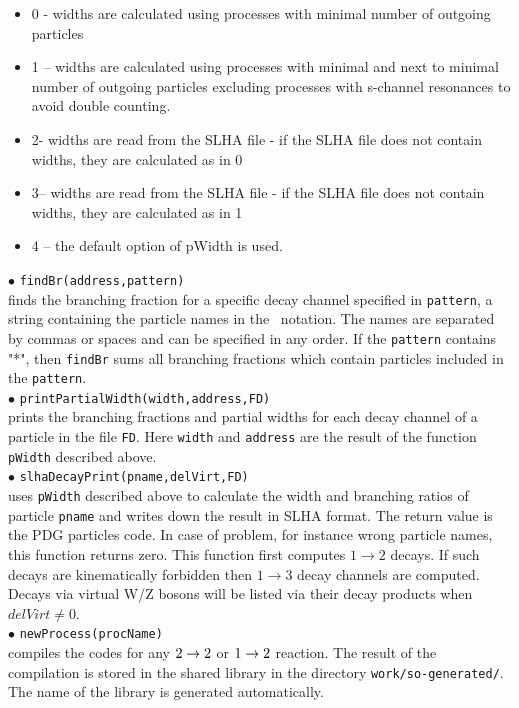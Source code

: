 \documentclass[12pt,a4paper]{article}
\begin{document}
\begin{itemize}
\item{}0 -  widths are calculated using processes with minimal number of outgoing particles
\item{}1 -- widths are calculated using processes with minimal and next to minimal number of outgoing particles excluding
                       processes with  s-channel resonances to avoid double counting.
                  \item{} 2- widths are read from the SLHA file - if the SLHA file does not contain widths, they are calculated as in 0
                    \item{} 3-- widths are read from the SLHA file - if the SLHA file does not contain widths, they are calculated as in 1
                       \item{} 4 -- the default option of pWidth is used. 
                       \end{itemize}

\noindent
$\bullet$ \verb|findBr(address,pattern)|\\ 
finds the branching fraction for a specific decay channel specified in
{\tt pattern},  a string containing the particle names 
in the \calchep\ notation. The names are separated by commas or spaces and can be specified in any
order. If the  {\tt pattern} contains  "*", then {\tt findBr} sums all branching fractions
which contain particles included in the {\tt pattern}.\\[2mm]
 \noindent
 $\bullet$ \verb|printPartialWidth(width,address,FD)|\\ 
prints the branching fractions and partial widths for each decay channel of a particle in the file {\tt FD}.   Here {\tt width} and {\tt address} are the result of the function  {\tt pWidth} described above.\\[2mm]
%
\noindent
$\bullet$ \verb|slhaDecayPrint(pname,delVirt,FD)|\\
uses \verb|pWidth| described above to calculate the width and branching ratios of particle \verb|pname| and writes down the result
in SLHA format. The return value is the PDG particles code. In case of problem, for
instance wrong particle names, this function returns zero. This function
first computes $1\to2$  decays. If such decays are kinematically
forbidden then $1\to3$ decay channels are computed. Decays via 
virtual W/Z bosons will be listed via their decay products when $delVirt \ne 0$.\\[2mm]
%
\noindent
$\bullet$ \verb|newProcess(procName)|\\
compiles the  codes for any $2\rightarrow 2$ or  $1\rightarrow 2$  reaction.
The result of the compilation is stored in the  shared library  in the directory \verb|work/so-generated/|. The name of the library is generated
automatically.
\end{document}
